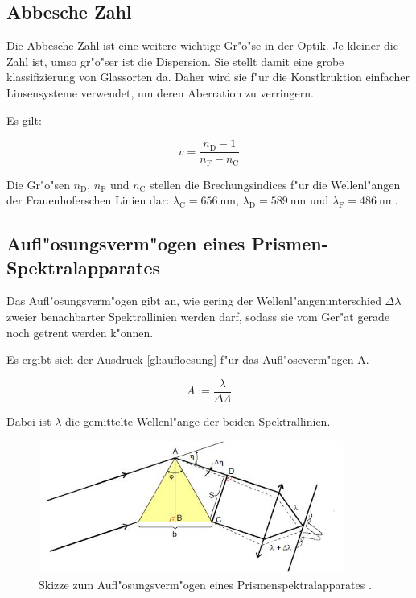 	\subsection{Abbesche Zahl} %
	\label{sub:abbesche_zahl}

	Die Abbesche Zahl ist eine weitere wichtige Gr"o"se in der Optik. Je kleiner die Zahl ist, umso gr"o"ser ist die Dispersion. Sie stellt damit eine grobe klassifizierung von Glassorten da. Daher wird sie f"ur die Konstkruktion einfacher Linsensysteme verwendet, um deren Aberration zu verringern. 

	Es gilt:

	\begin{equation}
		v = \frac{n_\mathrm{D} - 1}{n_\mathrm{F} - n_\mathrm{C}} \label{eqn:abbe}
	\end{equation}

	Die Gr"o"sen $n_\mathrm{D}$, $n_\mathrm{F}$ und $n_\mathrm{C}$ stellen die Brechungsindices f"ur die Wellenl"angen der Frauenhoferschen Linien dar: $\lambda_\mathrm{C} = \SI{656}{\nano\meter}$, $\lambda_\mathrm{D} = \SI{589}{\nano\meter}$ und $\lambda_\mathrm{F} = \SI{486}{\nano\meter}$.

	\subsection{Aufl"osungsverm"ogen eines Prismen-Spektralapparates} %
	\label{sub:aufl_osungsverm_ogen_eines_prismen_spektralapparates}
	
	Das Aufl"osungsverm"ogen gibt an, wie gering der Wellenl"angenunterschied $\Delta\lambda$ zweier benachbarter Spektrallinien werden darf, sodass sie vom Ger"at gerade noch getrent werden k"onnen.

	Es ergibt sich der Ausdruck \eqref{gl:aufloesung} f"ur das Aufl"oseverm"ogen A.

	\begin{equation}
		A := \frac{\lambda}{\Delta\Lambda} \label{gl:aufloesung}
	\end{equation}

	Dabei ist $\lambda$ die gemittelte Wellenl"ange der beiden Spektrallinien.

	\begin{figure}[!h]
		\centering
		\includegraphics[width = 10cm]{img/aufloesung.JPG}
		\caption{Skizze zum Aufl"osungsverm"ogen eines Prismenspektralapparates \cite{anleitung}.}
		\label{fg:aufloesung}
	\end{figure}

